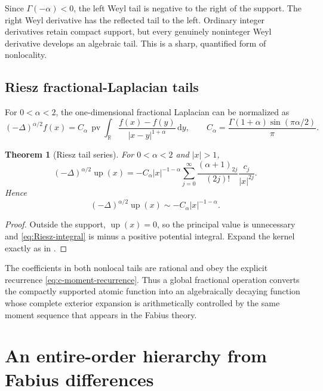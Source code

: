 \documentclass[11pt,oneside]{article}
\newtheorem{theorem}{Theorem}[section]
\theoremstyle{definition}
\theoremstyle{remark}
\newcommand{\R}{\mathbb R}
\newcommand{\Up}{\operatorname{up}}
\newcommand{\dd}{\,\mathrm d}
\newcommand{\poch}[2]{\left(#1\right)_{#2}}
\begin{document}
Since $\Gamma(-\alpha)<0$, the left Weyl tail is negative to the right of the
support.  The right Weyl derivative has the reflected tail to the left.
Ordinary integer derivatives retain compact support, but every genuinely
noninteger Weyl derivative develops an algebraic tail.  This is a sharp,
quantified form of nonlocality.

\subsection{Riesz fractional-Laplacian tails}

For $0<\alpha<2$, the one-dimensional fractional Laplacian can be normalized
as
\begin{equation}
 (-\Delta)^{\alpha/2}f(x)
 =C_\alpha\,\operatorname{pv}
  \int_{\R}\frac{f(x)-f(y)}{|x-y|^{1+\alpha}}\dd y,
 \qquad
 C_\alpha=\frac{\Gamma(1+\alpha)\sin(\pi\alpha/2)}{\pi}.
 \label{eq:Riesz-integral}
\end{equation}

\begin{theorem}[Riesz tail series]
For $0<\alpha<2$ and $|x|>1$,
\begin{equation}
 (-\Delta)^{\alpha/2}\Up(x)
 =-C_\alpha|x|^{-1-\alpha}
  \sum_{j=0}^{\infty}
  \frac{\poch{\alpha+1}{2j}}{(2j)!}
  \frac{c_j}{|x|^{2j}}.
 \label{eq:Riesz-tail-series}
\end{equation}
Hence
\begin{equation}
 (-\Delta)^{\alpha/2}\Up(x)
 \sim-C_\alpha|x|^{-1-\alpha}.
 \label{eq:Riesz-leading-tail}
\end{equation}
\end{theorem}

\begin{proof}
Outside the support, $\Up(x)=0$, so the principal value is unnecessary and
\eqref{eq:Riesz-integral} is minus a positive potential integral.  Expand the
kernel exactly as in .
\end{proof}

The coefficients in both nonlocal tails are rational and obey the explicit
recurrence \eqref{eq:c-moment-recurrence}.  Thus a global fractional
operation converts the compactly supported atomic function into an
algebraically decaying function whose complete exterior expansion is
arithmetically controlled by the same moment sequence that appears in the
Fabius theory.

\section{An entire-order hierarchy from Fabius differences}
\label{sec:difference-hierarchy}
\end{document}

